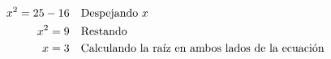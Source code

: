 \begin{minipage}[t][][t]{0.6\textwidth}
\begin{solutionbox}{9cm}
\begin{align*}
            x^2=25-16                                                      & \text{\quad Despejando } x                                    \\
            x^2=9                                                          & \text{\quad Restando}                                         \\
            x=3                                                            & \text{\quad Calculando la raíz en ambos lados de la ecuación} \\
        \end{align*}
    \end{solutionbox}
\end{minipage}
